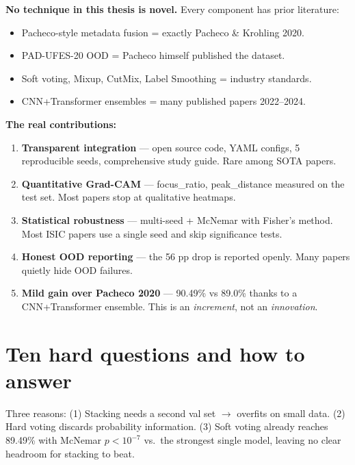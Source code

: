 \documentclass[11pt,a4paper]{article}
\begin{document}
\begin{idea}
\textbf{No technique in this thesis is novel.} Every component has prior literature:
\begin{itemize}[leftmargin=*]
  \item Pacheco-style metadata fusion = exactly Pacheco \& Krohling 2020.
  \item PAD-UFES-20 OOD = Pacheco himself published the dataset.
  \item Soft voting, Mixup, CutMix, Label Smoothing = industry standards.
  \item CNN+Transformer ensembles = many published papers 2022--2024.
\end{itemize}

\textbf{The real contributions:}
\begin{enumerate}[leftmargin=*]
  \item \textbf{Transparent integration} --- open source code, YAML configs, 5 reproducible seeds, comprehensive study guide. Rare among SOTA papers.
  \item \textbf{Quantitative Grad-CAM} --- focus\_ratio, peak\_distance measured on the test set. Most papers stop at qualitative heatmaps.
  \item \textbf{Statistical robustness} --- multi-seed + McNemar with Fisher's method. Most ISIC papers use a single seed and skip significance tests.
  \item \textbf{Honest OOD reporting} --- the 56 pp drop is reported openly. Many papers quietly hide OOD failures.
  \item \textbf{Mild gain over Pacheco 2020} --- 90.49\% vs 89.0\% thanks to a CNN+Transformer ensemble. This is an \textit{increment}, not an \textit{innovation}.
\end{enumerate}
\end{idea}

\section{Ten hard questions and how to answer}

\begin{qa}
Three reasons: (1) Stacking needs a second val set $\to$ overfits on small data. (2) Hard voting discards probability information. (3) Soft voting already reaches 89.49\% with McNemar $p < 10^{-7}$ vs.\ the strongest single model, leaving no clear headroom for stacking to beat.
\end{qa}
\end{document}

